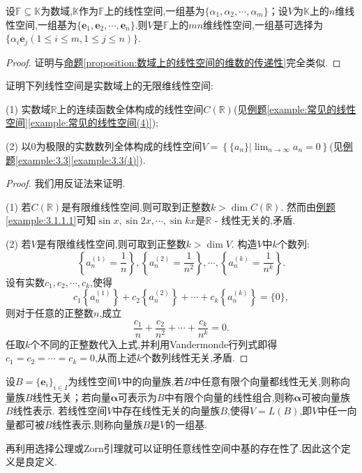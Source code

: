 \documentclass[../../main.tex]{subfiles}%
\begin{document}
\begin{proposition}\label{proposition:数域上的线性空间的基的传递性}
设\(\mathbb{F}\subseteq\mathbb{K}\)为数域,\(\mathbb{K}\)作为\(\mathbb{F}\)上的线性空间,一组基为\(\{\alpha_1,\alpha_2,\cdots,\alpha_m\}\)；设\(V\)为\(\mathbb{K}\)上的\(n\)维线性空间,一组基为\(\{\boldsymbol{e}_1,\boldsymbol{e}_2,\cdots,\boldsymbol{e}_n\}\).则\(V\)是\(\mathbb{F}\)上的\(mn\)维线性空间,一组基可选择为\(\{\alpha_i\boldsymbol{e}_j(1\leqslant  i\leqslant  m,1\leqslant  j\leqslant  n)\}\).
\end{proposition}
\begin{proof}

证明与\hyperref[proposition:数域上的线性空间的维数的传递性]{命题\ref{proposition:数域上的线性空间的维数的传递性}}完全类似.

\end{proof}

\begin{example}
证明下列线性空间是实数域上的无限维线性空间:

(1) 实数域\(\mathbb{R}\)上的连续函数全体构成的线性空间\(C(\mathbb{R})\)(见\hyperref[example:常见的线性空间(4)]{例题\ref{example:常见的线性空间}\ref{example:常见的线性空间(4)}});

(2) 以\(0\)为极限的实数数列全体构成的线性空间\(V = \left\{\{a_n\}|\lim_{n\rightarrow\infty}a_n = 0\right\}\)(见\hyperref[example:3.3(4)]{例题\ref{example:3.3}\ref{example:3.3(4)}}).
\end{example}
\begin{proof}

我们用反证法来证明.

(1) 若\(C(\mathbb{R})\)是有限维线性空间,则可取到正整数\(k>\dim C(\mathbb{R})\). 然而由\hyperref[example:3.1.1.1]{例题\ref{example:3.1.1.1}}可知\(\sin x,\sin 2x,\cdots,\sin kx\)是\(\mathbb{R}\) - 线性无关的,矛盾.

(2) 若\(V\)是有限维线性空间,则可取到正整数\(k>\dim V\). 构造\(V\)中\(k\)个数列:
\[
\left\{a_n^{(1)}=\frac{1}{n}\right\},\left\{a_n^{(2)}=\frac{1}{n^2}\right\},\cdots,\left\{a_n^{(k)}=\frac{1}{n^k}\right\}.
\]
设有实数\(c_1,c_2,\cdots,c_k\),使得
\[
c_1\left\{a_n^{(1)}\right\}+c_2\left\{a_n^{(2)}\right\}+\cdots + c_k\left\{a_n^{(k)}\right\}=\{0\},
\]
则对于任意的正整数\(n\),成立
\[
\frac{c_1}{n}+\frac{c_2}{n^2}+\cdots+\frac{c_k}{n^k}=0.
\]
任取\(k\)个不同的正整数代入上式,并利用Vandermonde行列式即得\(c_1 = c_2=\cdots = c_k = 0\),从而上述\(k\)个数列线性无关,矛盾. 

\end{proof}

\begin{definition}[无限维空间基的定义]\label{definition:无限维空间基的定义}
设\(B = \{ \boldsymbol{e}_i\}_{i\in I}\)为线性空间\(V\)中的向量族,若\(B\)中任意有限个向量都线性无关,则称向量族\(B\)线性无关；若向量\(\boldsymbol{\alpha}\)可表示为\(B\)中有限个向量的线性组合,则称\(\boldsymbol{\alpha}\)可被向量族\(B\)线性表示. 若线性空间\(V\)中存在线性无关的向量族\(B\),使得\(V = L(B)\),即\(V\)中任一向量都可被\(B\)线性表示,则称向量族\(B\)是\(V\)的一组基.
\end{definition}
\begin{note}
再利用选择公理或Zorn引理就可以证明任意线性空间中基的存在性了.因此这个定义是良定义.
\end{note}
\end{document}
